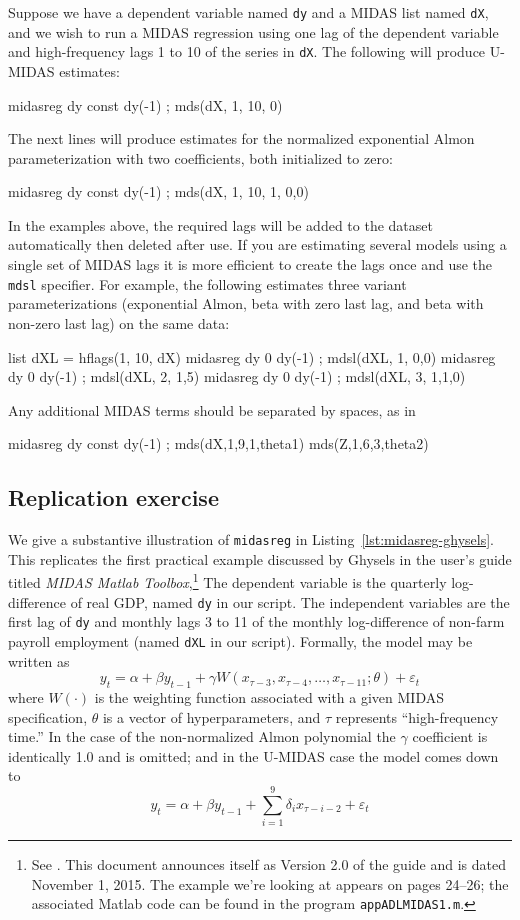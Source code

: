 \documentclass{article}
\begin{document}
Suppose we have a dependent variable named \texttt{dy} and a MIDAS
list named \texttt{dX}, and we wish to run a MIDAS regression using
one lag of the dependent variable and high-frequency lags 1 to 10 of
the series in \texttt{dX}. The following will produce U-MIDAS
estimates:
%
\begin{code}
midasreg dy const dy(-1) ; mds(dX, 1, 10, 0)
\end{code}
%
The next lines will produce estimates for the normalized exponential
Almon parameterization with two coefficients, both initialized to
zero:
%
\begin{code}
midasreg dy const dy(-1) ; mds(dX, 1, 10, 1, {0,0})
\end{code}
%
In the examples above, the required lags will be added to the dataset
automatically then deleted after use. If you are estimating several
models using a single set of MIDAS lags it is more efficient to create
the lags once and use the \texttt{mdsl} specifier.  For example, the
following estimates three variant parameterizations (exponential
Almon, beta with zero last lag, and beta with non-zero last lag) on
the same data:
\begin{code}
list dXL = hflags(1, 10, dX)
midasreg dy 0 dy(-1) ; mdsl(dXL, 1, {0,0})
midasreg dy 0 dy(-1) ; mdsl(dXL, 2, {1,5})
midasreg dy 0 dy(-1) ; mdsl(dXL, 3, {1,1,0})
\end{code}

Any additional MIDAS terms should be separated by spaces, as in
\begin{code}
midasreg dy const dy(-1) ; mds(dX,1,9,1,theta1) mds(Z,1,6,3,theta2)
\end{code}

\subsection{Replication exercise}

We give a substantive illustration of \texttt{midasreg} in
Listing~\ref{lst:midasreg-ghysels}. This replicates the first
practical example discussed by Ghysels in the user's guide titled
\textit{MIDAS Matlab Toolbox},\footnote{See \cite{ghysels15}. This
  document announces itself as Version 2.0 of the guide and is dated
  November 1, 2015. The example we're looking at appears on pages
  24--26; the associated \textsf{Matlab} code can be found in the
  program \texttt{appADLMIDAS1.m}.}
The dependent variable is the quarterly log-difference of
real GDP, named \texttt{dy} in our script. The independent variables
are the first lag of \texttt{dy} and monthly lags 3 to 11 of the
monthly log-difference of non-farm payroll employment (named
\texttt{dXL} in our script). Formally, the model may be written
as
\[
  y_t = \alpha + \beta y_{t-1} + \gamma W(x_{\tau-3}, x_{\tau-4},\dots,
  x_{\tau-11}; \theta) + \varepsilon_t
\]
where $W(\cdot)$ is the weighting function associated with a given
MIDAS specification, $\theta$ is a vector of hyperparameters, and
$\tau$ represents ``high-frequency time.'' In the case of the
non-normalized Almon polynomial the $\gamma$ coefficient is
identically 1.0 and is omitted; and in the U-MIDAS case the model
comes down to
\[
  y_t = \alpha + \beta y_{t-1} + \sum_{i=1}^9 \delta_i x_{\tau-i-2}
  + \varepsilon_t
\]
\end{document}
